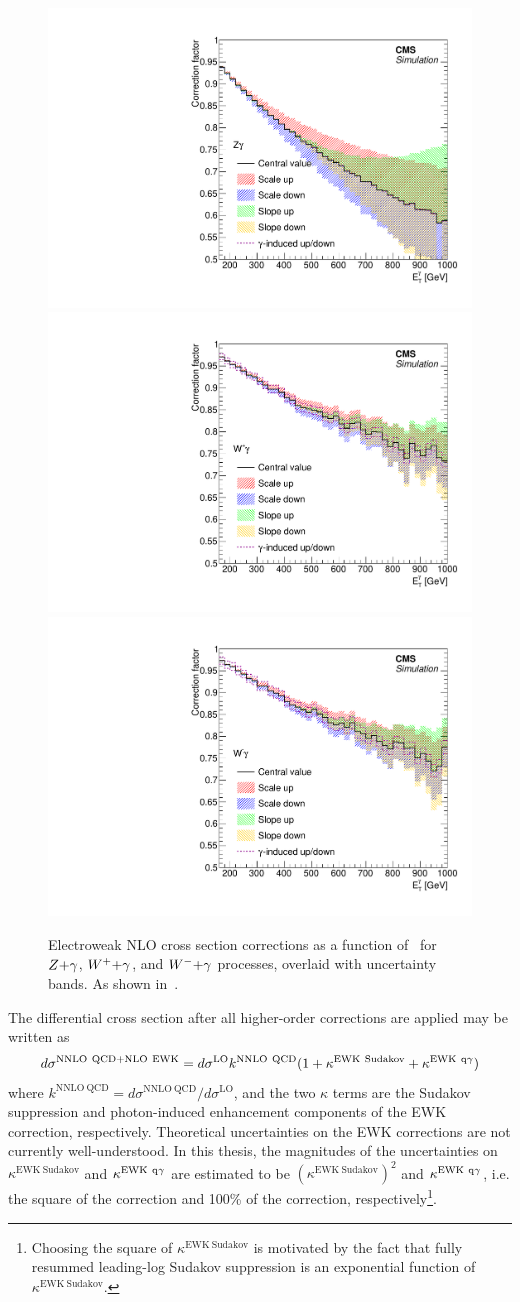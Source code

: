 \begin{figure}[htbp]
  \centering
  \includegraphics[width=0.48\linewidth]{Figures/exo16053/Figure_012-a}
  \includegraphics[width=0.48\linewidth]{Figures/exo16053/Figure_012-b}
  \includegraphics[width=0.48\linewidth]{Figures/exo16053/Figure_012-c}
  \caption{
    Electroweak NLO cross section corrections as a function of \pTgamma\ for $Z{+}\gamma$, $W^\mathrm{+}{+}\gamma$, and $W^\mathrm{-}{+}\gamma$
    processes, overlaid with uncertainty bands. As shown in~\cite{ref:JHEP02(2019)074}.
  }
  \label{fig:ewk_correction}
\end{figure}

The differential cross section after all higher-order corrections are applied may be written as
\begin{equation}
  d\sigma^{\mathrm{NNLO\ QCD}+\mathrm{NLO\ EWK}} = d\sigma^{\mathrm{LO}} k^{\mathrm{NNLO\ QCD}} (1 + \kappa^{\mathrm{EWK\ Sudakov}} + \kappa^{\mathrm{EWK\ \Pq\Pgamma}})
\end{equation}
where $k^{\mathrm{NNLO\ QCD}} = d\sigma^{\mathrm{NNLO\ QCD}} / d\sigma^{\mathrm{LO}}$, and the two $\kappa$
terms are the Sudakov suppression and photon-induced enhancement components of the EWK
correction, respectively. Theoretical uncertainties on the EWK corrections are not currently well-understood. In this thesis,
the magnitudes of the uncertainties on $\kappa^{\mathrm{EWK\ Sudakov}}$ and $\kappa^{\mathrm{EWK\ \Pq\Pgamma}}$ are estimated
to be $(\kappa^{\mathrm{EWK\ Sudakov}})^2$ and $\kappa^{\mathrm{EWK\ \Pq\Pgamma}}$, i.e. the square of
the correction and 100\% of the correction, respectively\footnote{Choosing the square of $\kappa^{\mathrm{EWK\ Sudakov}}$ is motivated by the fact
that fully resummed leading-log Sudakov suppression is an exponential function of $\kappa^{\mathrm{EWK\ Sudakov}}$.}.

